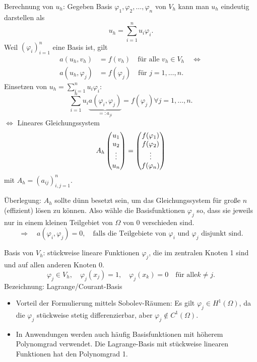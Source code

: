 Berechnung von $u_h$: Gegeben Basis $\varphi_1, \varphi_2, \ldots, \varphi_n$
von $V_h$ kann man $u_h$ eindeutig darstellen als
\[ u_h = \sum_{i=1}^n u_i \varphi_i. \]
Weil $(\varphi_i)_{i=1}^n$ eine Basis ist, gilt
\begin{align*}
  a( u_h, v_h )
  &= f(v_h) \quad \text{für alle } v_h \in V_h 
    \quad \Leftrightarrow \\
  a( u_h, \varphi_j )
  &= f( \varphi_j ) \quad \text{für } j = 1,\ldots,n.
\end{align*}
Einsetzen von $u_h = \sum_{i=1}^n u_i \varphi_i$:
\[ \sum_{i=1}^n u_i
  \underbrace{a(\varphi_i, \varphi_j)}_{=: a_{ji}}
  = f(\varphi_j) \forall j = 1,
  \ldots, n. \]
$\Leftrightarrow$ Lineares Gleichungssystem
\[ A_h \begin{pmatrix}u_1 \\ u_2 \\ \vdots \\ u_n\end{pmatrix} =
  \begin{pmatrix}f(\varphi_1) \\ f(\varphi_2) \\ \vdots \\ f(\varphi_n)\end{pmatrix} \]
mit $A_h = (a_{ij})_{i,j=1}^n$.

Überlegung: $A_h$ sollte dünn besetzt sein, um das Gleichungssystem für große
$n$ (effizient) lösen zu können. Also wähle die Basisfunktionen $\varphi_j$ so,
dass sie jeweils nur in einem kleinen Teilgebiet von $\Omega$ von 0 verschieden
sind.
\[ \Rightarrow \quad a( \varphi_i, \varphi_j ) = 0, \quad \text{falls die
    Teilgebiete von $\varphi_i$ und $\varphi_j$ disjunkt sind.}\]


Basis von $V_h$: stückweise lineare Funktionen $\varphi_j$, die im zentralen
Knoten 1 sind und auf allen anderen Knoten 0.
\[ \varphi_j \in V_h, \quad \varphi_j (x_j) = 1, \quad \varphi_j(x_k) = 0 \quad
  \text{für alle} k \ne j. \]
Bezeichnung: Lagrange/Courant-Basis

\begin{rmrk*}
  \begin{itemize}
  \item Vorteil der Formulierung mittels Sobolev-Räumen: Es gilt $\varphi_j \in
    H^1(\Omega)$, da die $\varphi_j$ stückweise stetig differenzierbar, aber
    $\varphi_j \notin C^1(\Omega)$.
  \item In Anwendungen werden auch häufig Basisfunktionen mit höherem
    Polynomgrad verwendet. Die Lagrange-Basis mit stückweise linearen Funktionen
    hat den Polynomgrad 1.
  \end{itemize}
\end{rmrk*}

